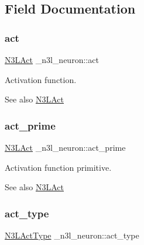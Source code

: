 \subsection{Field Documentation}
\mbox{\label{struct__n3l__neuron_a3ed17ddbe86d42ed6b7d31256b109262}} 
\subsubsection{\texorpdfstring{act}{act}}
{\footnotesize\ttfamily \hyperlink{n3__header_8h_afb10e6f7012513b51225a4d3add36cae}{N3\+L\+Act} \+\_\+n3l\+\_\+neuron\+::act}

Activation function. \begin{DoxySeeAlso}{See also}
\hyperlink{n3__header_8h_afb10e6f7012513b51225a4d3add36cae}{N3\+L\+Act} 
\end{DoxySeeAlso}
\mbox{\label{struct__n3l__neuron_a9c9de65191cb097fd7a71752c83fc3db}} 
\subsubsection{\texorpdfstring{act\+\_\+prime}{act\_prime}}
{\footnotesize\ttfamily \hyperlink{n3__header_8h_afb10e6f7012513b51225a4d3add36cae}{N3\+L\+Act} \+\_\+n3l\+\_\+neuron\+::act\+\_\+prime}

Activation function primitive. \begin{DoxySeeAlso}{See also}
\hyperlink{n3__header_8h_afb10e6f7012513b51225a4d3add36cae}{N3\+L\+Act} 
\end{DoxySeeAlso}
\mbox{\label{struct__n3l__neuron_af424e7accb8d1d089b828a1de69e03a0}} 
\subsubsection{\texorpdfstring{act\+\_\+type}{act\_type}}
{\footnotesize\ttfamily \hyperlink{n3__header_8h_a3118e8995213ca26bd388c3d94cd8056}{N3\+L\+Act\+Type} \+\_\+n3l\+\_\+neuron\+::act\+\_\+type}

